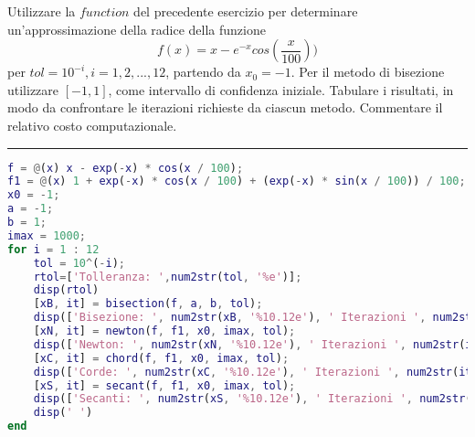Utilizzare la $function$ del precedente esercizio per determinare un'approssimazione della
radice della funzione
$$f(x)=x-e^{-x}cos(\frac{x}{100}))$$
per $tol=10^{-i}, i=1,2,...,12$, partendo da $x_\mathrm{0}=-1$. Per il metodo di bisezione utilizzare 
$[-1,1]$, come intervallo di confidenza iniziale. Tabulare i risultati, in modo da confrontare le iterazioni
richieste da ciascun metodo. Commentare il relativo costo computazionale.

\hspace{1cm}
\par\noindent\rule{\textwidth}{0.4pt}
\hspace{1cm}

\begin{lstlisting}[language=Matlab, caption=Codice Matlab]
f = @(x) x - exp(-x) * cos(x / 100);
f1 = @(x) 1 + exp(-x) * cos(x / 100) + (exp(-x) * sin(x / 100)) / 100;
x0 = -1;
a = -1;
b = 1;
imax = 1000;
for i = 1 : 12
	tol = 10^(-i);
	rtol=['Tolleranza: ',num2str(tol, '%e')];
	disp(rtol)
	[xB, it] = bisection(f, a, b, tol);
	disp(['Bisezione: ', num2str(xB, '%10.12e'), ' Iterazioni ', num2str(it)])
	[xN, it] = newton(f, f1, x0, imax, tol);
	disp(['Newton: ', num2str(xN, '%10.12e'), ' Iterazioni ', num2str(it)])
	[xC, it] = chord(f, f1, x0, imax, tol);
	disp(['Corde: ', num2str(xC, '%10.12e'), ' Iterazioni ', num2str(it)])
	[xS, it] = secant(f, f1, x0, imax, tol);
	disp(['Secanti: ', num2str(xS, '%10.12e'), ' Iterazioni ', num2str(it)])
	disp(' ')
end
\end{lstlisting}

